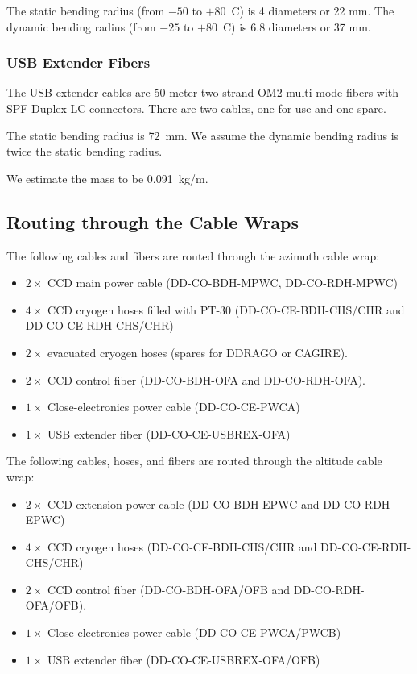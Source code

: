 \documentclass{article}
\begin{document}
The static bending radius (from $-50$ to $+80$~C) is 4 diameters or 22 mm. The dynamic bending radius (from $-25$ to $+80$~C) is 6.8 diameters or 37 mm.

\subsubsection{USB Extender Fibers}

The USB extender cables are 50-meter two-strand OM2 multi-mode fibers with SPF Duplex LC connectors. There are two cables, one for use and one spare.

The static bending radius is 72~mm. We assume the dynamic bending radius is twice the static bending radius.

We estimate the mass to be 0.091~kg/m.

\subsection{Routing through the Cable Wraps}

The following cables and fibers are routed through the azimuth cable wrap:
\begin{itemize}
\item $2 \times$ CCD main power cable (DD-CO-BDH-MPWC, DD-CO-RDH-MPWC)
\item $4 \times$ CCD cryogen hoses filled with PT-30 (DD-CO-CE-BDH-CHS/CHR and DD-CO-CE-RDH-CHS/CHR)
\item $2 \times$ evacuated cryogen hoses (spares for DDRAGO or CAGIRE).
\item $2 \times$ CCD control fiber (DD-CO-BDH-OFA and DD-CO-RDH-OFA).
\item $1 \times$ Close-electronics power cable (DD-CO-CE-PWCA)
\item $1 \times$ USB extender fiber (DD-CO-CE-USBREX-OFA)
\end{itemize}

The following cables, hoses, and fibers are routed through the altitude cable wrap:
\begin{itemize}
\item $2 \times$ CCD extension power cable (DD-CO-BDH-EPWC and DD-CO-RDH-EPWC)
\item $4 \times$ CCD cryogen hoses (DD-CO-CE-BDH-CHS/CHR and DD-CO-CE-RDH-CHS/CHR)
\item $2 \times$ CCD control fiber (DD-CO-BDH-OFA/OFB and DD-CO-RDH-OFA/OFB).
\item $1 \times$ Close-electronics power cable (DD-CO-CE-PWCA/PWCB)
\item $1 \times$ USB extender fiber (DD-CO-CE-USBREX-OFA/OFB)
\end{itemize}
\end{document}
